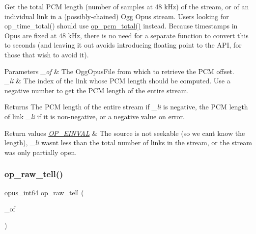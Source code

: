 Get the total P\+CM length (number of samples at 48 k\+Hz) of the stream, or of an individual link in a (possibly-\/chained) Ogg Opus stream. Users looking for {\ttfamily op\+\_\+time\+\_\+total()} should use \hyperlink{group__stream__info_ga8c228c3d95f2c903ad6cfd2b78d8dad6}{op\+\_\+pcm\+\_\+total()} instead. Because timestamps in Opus are fixed at 48 k\+Hz, there is no need for a separate function to convert this to seconds (and leaving it out avoids introducing floating point to the A\+PI, for those that wish to avoid it). 
\begin{DoxyParams}{Parameters}
{\em \+\_\+of} & The {\ttfamily Ogg\+Opus\+File} from which to retrieve the P\+CM offset. \\
\hline
{\em \+\_\+li} & The index of the link whose P\+CM length should be computed. Use a negative number to get the P\+CM length of the entire stream. \\
\hline
\end{DoxyParams}
\begin{DoxyReturn}{Returns}
The P\+CM length of the entire stream if {\itshape \+\_\+li} is negative, the P\+CM length of link {\itshape \+\_\+li} if it is non-\/negative, or a negative value on error. 
\end{DoxyReturn}

\begin{DoxyRetVals}{Return values}
{\em \hyperlink{group__error__codes_gae0879acafe9cc0ab72462d291fdb6fb6}{O\+P\+\_\+\+E\+I\+N\+V\+AL}} & The source is not seekable (so we can\textquotesingle{}t know the length), {\itshape \+\_\+li} wasn\textquotesingle{}t less than the total number of links in the stream, or the stream was only partially open. \\
\hline
\end{DoxyRetVals}
\mbox{\label{group__stream__info_gab857684ab149c6225884ad94c3787561}} 
\subsubsection{\texorpdfstring{op\+\_\+raw\+\_\+tell()}{op\_raw\_tell()}}
{\footnotesize\ttfamily \hyperlink{opus__types_8h_ab6742070cf9d0ccffca2b80522b4f41a}{opus\+\_\+int64} op\+\_\+raw\+\_\+tell (\begin{DoxyParamCaption}\item[{\hyperlink{zconf_8h_a2c212835823e3c54a8ab6d95c652660e}{const} Ogg\+Opus\+File $\ast$}]{\+\_\+of }\end{DoxyParamCaption})}

